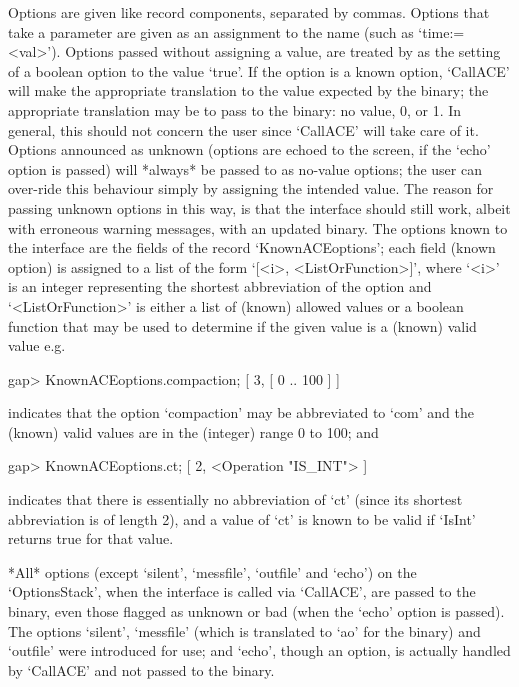 \endlist

Options  are  given  like  record  components,  separated  by  commas.
Options that take a parameter are  given as an  assignment to the name
(such  as `time:=<val>').   Options passed without assigning a value,
are treated by {\GAP} as the setting of a boolean option to the value
`true'. If the option is a known {\ACE} option, `CallACE' will   make
the   appropriate  translation  to  the value expected by the  {\ACE}
binary; the appropriate translation may be to pass to the binary:  no
value, 0, or 1.  In general,  this  should not concern the user since
`CallACE' will take care of it. Options announced as unknown (options
are  echoed  to  the  screen,  if  the  `echo' option is passed) will
*always*  be  passed to  {\ACE} as no-value  options;  the  user  can
over-ride this behaviour  simply by assigning the intended value. The
reason for  passing  unknown  options in this way, is that the {\ACE} 
interface should still work,  albeit with erroneous warning messages,
with  an  updated  binary. The  {\ACE}  options  known  to the {\ACE} 
interface are the fields of the record `KnownACEoptions';  each field
(known {\ACE} option) is assigned to a list of the form
`[<i>, <ListOrFunction>]', where `<i>' is an integer representing the
shortest abbreviation of the option and `<ListOrFunction>' is  either
a list of (known) allowed values or a boolean function that  may   be 
used to determine if the given value is a (known) valid value e.g.

\begintt
gap> KnownACEoptions.compaction;
[ 3, [ 0 .. 100 ] ]
\endtt

indicates that the option `compaction' may be  abbreviated  to  `com'
and the (known) valid values are in the (integer) range 0 to 100; and

\begintt
gap> KnownACEoptions.ct;
[ 2, <Operation "IS_INT"> ]
\endtt

indicates that there is essentially no abbreviation of `ct' (since its
shortest abbreviation is of length 2),  and a value of  `ct' is  known
to be valid if `IsInt' returns true for that value.

*All* options (except `silent', `messfile', `outfile' and `echo')   on
the `OptionsStack', when the {\ACE} interface is called via `CallACE',
are passed to the {\ACE} binary, even those flagged  as unknown or bad
(when the `echo' option is passed). The options `silent',   `messfile'
(which  is  translated  to  `ao'  for  the  binary) and `outfile' were
introduced for {\GAP} use;  and `echo',  though an {\ACE} option,   is 
actually handled by `CallACE' and not passed to the binary.

